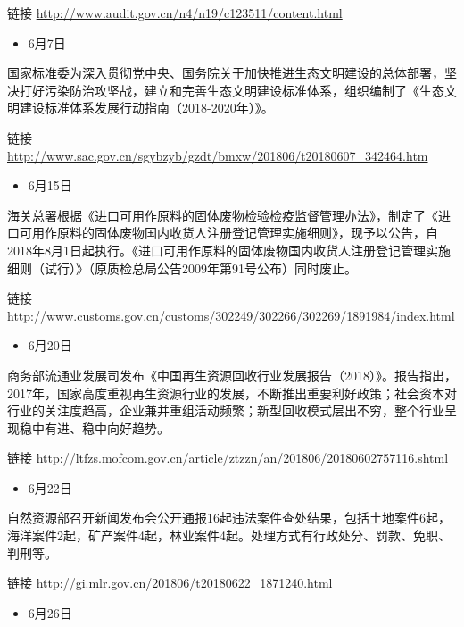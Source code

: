 \documentclass[
]{book}
\providecommand{\tightlist}{%
  \setlength{\itemsep}{0pt}\setlength{\parskip}{0pt}}
\begin{document}
链接 \url{http://www.audit.gov.cn/n4/n19/c123511/content.html}

\begin{itemize}
\tightlist
\item
  6月7日
\end{itemize}

国家标准委为深入贯彻党中央、国务院关于加快推进生态文明建设的总体部署，坚决打好污染防治攻坚战，建立和完善生态文明建设标准体系，组织编制了《生态文明建设标准体系发展行动指南（2018-2020年）》。

链接 \url{http://www.sac.gov.cn/sgybzyb/gzdt/bmxw/201806/t20180607_342464.htm}

\begin{itemize}
\tightlist
\item
  6月15日
\end{itemize}

海关总署根据《进口可用作原料的固体废物检验检疫监督管理办法》，制定了《进口可用作原料的固体废物国内收货人注册登记管理实施细则》，现予以公告，自2018年8月1日起执行。《进口可用作原料的固体废物国内收货人注册登记管理实施细则（试行）》（原质检总局公告2009年第91号公布）同时废止。

链接 \url{http://www.customs.gov.cn/customs/302249/302266/302269/1891984/index.html}

\begin{itemize}
\tightlist
\item
  6月20日
\end{itemize}

商务部流通业发展司发布《中国再生资源回收行业发展报告（2018）》。报告指出，2017年，国家高度重视再生资源行业的发展，不断推出重要利好政策；社会资本对行业的关注度趋高，企业兼并重组活动频繁；新型回收模式层出不穷，整个行业呈现稳中有进、稳中向好趋势。

链接 \url{http://ltfzs.mofcom.gov.cn/article/ztzzn/an/201806/20180602757116.shtml}

\begin{itemize}
\tightlist
\item
  6月22日
\end{itemize}

自然资源部召开新闻发布会公开通报16起违法案件查处结果，包括土地案件6起，海洋案件2起，矿产案件4起，林业案件4起。处理方式有行政处分、罚款、免职、判刑等。

链接 \url{http://gi.mlr.gov.cn/201806/t20180622_1871240.html}

\begin{itemize}
\tightlist
\item
  6月26日
\end{itemize}
\end{document}
